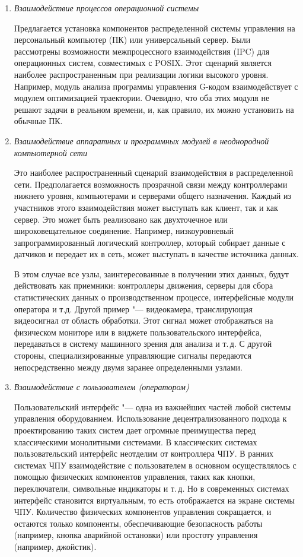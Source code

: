 \begin{enumerate}
\item\textit{Взаимодействие процессов операционной системы}

Предлагается установка компонентов распределенной системы управления на персональный компьютер (ПК) или универсальный сервер. Были рассмотрены возможности межпроцессного взаимодействия (IPC) для операционных систем, совместимых с POSIX. Этот сценарий является наиболее распространенным при реализации логики высокого уровня. Например, модуль анализа программы управления G-кодом взаимодействует с модулем оптимизацией траектории. Очевидно, что оба этих модуля не решают задачи в реальном времени, и, как правило, их можно установить на обычные ПК.

\item\textit{Взаимодействие аппаратных и программных модулей в неоднородной компьютерной сети}

Это наиболее распространенный сценарий взаимодействия в распределенной сети. Предполагается возможность прозрачной связи между контроллерами нижнего уровня, компьютерами и серверами общего назначения. Каждый из участников этого взаимодействия может выступать как клиент, так и как сервер. Это может быть реализовано как двухточечное или широковещательное соединение. Например, низкоуровневый запрограммированный логический контроллер, который собирает данные с датчиков и передает их в сеть, может выступать в качестве источника данных.

В этом случае все узлы, заинтересованные в получении этих данных, будут действовать как приемники: контроллеры движения, серверы для сбора статистических данных о производственном процессе, интерфейсные модули оператора и т.д. Другой пример "--- видеокамера, транслирующая видеосигнал от область обработки. Этот сигнал может отображаться на физическом мониторе или в виджете пользовательского интерфейса, передаваться в систему машинного зрения для анализа и т.\,д. С другой стороны, специализированные управляющие сигналы передаются непосредственно между двумя заранее определенными узлами.

\item\textit{Взаимодействие с пользователем (оператором)}

Пользовательский интерфейс "--- одна из важнейших частей любой системы управления оборудованием. Использование децентрализованного подхода к проектированию таких систем дает огромные преимущества перед классическими монолитными системами. В классических системах пользовательский интерфейс неотделим от контроллера ЧПУ. В ранних системах ЧПУ взаимодействие с пользователем в основном осуществлялось с помощью физических компонентов управления, таких как кнопки, переключатели, символьные индикаторы и т.\,д. Но в современных системах интерфейс становится виртуальным, то есть отображается на экране системы ЧПУ. Количество физических компонентов управления сокращается, и остаются только компоненты, обеспечивающие безопасность работы (например, кнопка аварийной остановки) или простоту управления (например, джойстик).


\end{enumerate}
